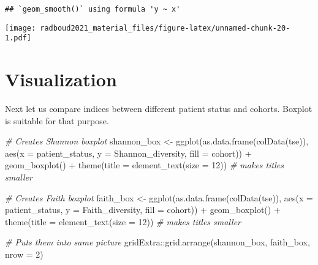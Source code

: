 \documentclass[
]{book}
\newenvironment{Shaded}{\begin{snugshade}}{\end{snugshade}}
\newcommand{\AttributeTok}[1]{\textcolor[rgb]{0.77,0.63,0.00}{#1}}
\newcommand{\CommentTok}[1]{\textcolor[rgb]{0.56,0.35,0.01}{\textit{#1}}}
\newcommand{\DecValTok}[1]{\textcolor[rgb]{0.00,0.00,0.81}{#1}}
\newcommand{\FunctionTok}[1]{\textcolor[rgb]{0.00,0.00,0.00}{#1}}
\newcommand{\NormalTok}[1]{#1}
\newcommand{\OtherTok}[1]{\textcolor[rgb]{0.56,0.35,0.01}{#1}}
\newcommand{\SpecialCharTok}[1]{\textcolor[rgb]{0.00,0.00,0.00}{#1}}
\begin{document}
\begin{verbatim}
## `geom_smooth()` using formula 'y ~ x'
\end{verbatim}

\texttt{[image: radboud2021\_material\_files/figure-latex/unnamed-chunk-20-1.pdf]}

\hypertarget{visualization-1}{%
\section{Visualization}\label{visualization-1}}

Next let us compare indices between different patient status and
cohorts. Boxplot is suitable for that purpose.

\begin{Shaded}
\begin{Highlighting}[]
\CommentTok{\# Creates Shannon boxplot }
\NormalTok{shannon\_box }\OtherTok{\textless{}{-}} \FunctionTok{ggplot}\NormalTok{(}\FunctionTok{as.data.frame}\NormalTok{(}\FunctionTok{colData}\NormalTok{(tse)),}
  \FunctionTok{aes}\NormalTok{(}\AttributeTok{x =}\NormalTok{ patient\_status, }
      \AttributeTok{y =}\NormalTok{ Shannon\_diversity,}
      \AttributeTok{fill =}\NormalTok{ cohort)) }\SpecialCharTok{+} 
  \FunctionTok{geom\_boxplot}\NormalTok{() }\SpecialCharTok{+}
  \FunctionTok{theme}\NormalTok{(}\AttributeTok{title =} \FunctionTok{element\_text}\NormalTok{(}\AttributeTok{size =} \DecValTok{12}\NormalTok{)) }\CommentTok{\# makes titles smaller}

\CommentTok{\# Creates Faith boxplot }
\NormalTok{faith\_box }\OtherTok{\textless{}{-}} \FunctionTok{ggplot}\NormalTok{(}\FunctionTok{as.data.frame}\NormalTok{(}\FunctionTok{colData}\NormalTok{(tse)), }\FunctionTok{aes}\NormalTok{(}\AttributeTok{x =}\NormalTok{ patient\_status, }
                                                     \AttributeTok{y =}\NormalTok{ Faith\_diversity, }
                                                     \AttributeTok{fill =}\NormalTok{ cohort)) }\SpecialCharTok{+} 
  \FunctionTok{geom\_boxplot}\NormalTok{() }\SpecialCharTok{+}
  \FunctionTok{theme}\NormalTok{(}\AttributeTok{title =} \FunctionTok{element\_text}\NormalTok{(}\AttributeTok{size =} \DecValTok{12}\NormalTok{)) }\CommentTok{\# makes titles smaller}

\CommentTok{\# Puts them into same picture}
\NormalTok{gridExtra}\SpecialCharTok{::}\FunctionTok{grid.arrange}\NormalTok{(shannon\_box, faith\_box, }\AttributeTok{nrow =} \DecValTok{2}\NormalTok{)}
\end{Highlighting}
\end{Shaded}
\end{document}
